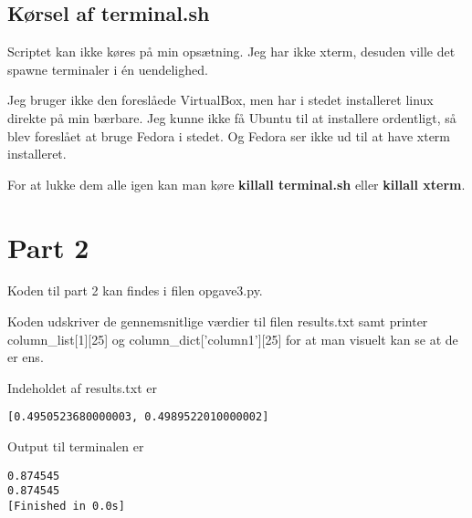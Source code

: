 \documentclass[12pt]{article}
\begin{document}
\subsection{Kørsel af terminal.sh}

Scriptet kan ikke køres på min opsætning. Jeg har ikke xterm, desuden ville det spawne terminaler i én uendelighed.

Jeg bruger ikke den foreslåede VirtualBox, men har i stedet installeret linux direkte på min bærbare. Jeg kunne ikke få Ubuntu til at installere ordentligt, så blev foreslået at bruge Fedora i stedet. Og Fedora ser ikke ud til at have xterm installeret.

For at lukke dem alle igen kan man køre \textbf{killall terminal.sh} eller \textbf{killall xterm}.

\section{Part 2}

Koden til part 2 kan findes i filen opgave3.py.

Koden udskriver de gennemsnitlige værdier til filen results.txt samt printer column\_list[1][25] og column\_dict['column1'][25] for at man visuelt kan se at de er ens.

Indeholdet af results.txt er

\begin{lstlisting}
[0.4950523680000003, 0.4989522010000002]
\end{lstlisting}

Output til terminalen er

\begin{lstlisting}
0.874545
0.874545
[Finished in 0.0s]
\end{lstlisting}
\end{document}
